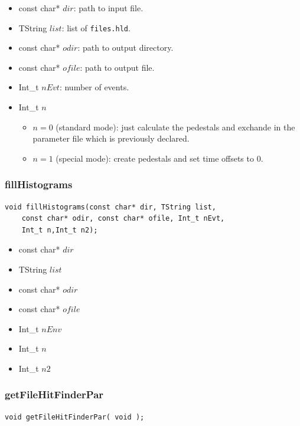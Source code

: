 \documentclass[a4paper]{book}
\begin{document}
\begin{itemize}
	\item const char* $dir$: path to input file.
	\item TString $list$: list of \texttt{files.hld}.
	\item const char* $odir$: path to output directory.
	\item const char* $ofile$: path to output file.
	\item Int\_t $nEvt$: number of events.
	\item Int\_t $n$
	\begin{itemize}
		\item $n = 0$ (standard mode): just calculate the pedestals and exchande in the parameter file which is previously declared.
		\item $n = 1$ (special mode):  create pedestals and set time offsets to 0.
	\end{itemize}
\end{itemize}


\subsubsection{fillHistograms}

\begin{lstlisting}
void fillHistograms(const char* dir, TString list,
	const char* odir, const char* ofile, Int_t nEvt,
 	Int_t n,Int_t n2);
\end{lstlisting}

\begin{itemize}
	\item const char* $dir$
	\item TString $list$
	\item const char* $odir$
	\item const char* $ofile$
	\item Int\_t $nEnv$
	\item Int\_t $n$
	\item Int\_t $n2$
	
\end{itemize}

\subsubsection{getFileHitFinderPar}

\begin{lstlisting}
void getFileHitFinderPar( void );
\end{lstlisting}
\end{document}
